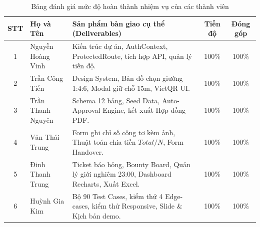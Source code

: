 \begin{table}[htbp]
\centering
\caption{Bảng đánh giá mức độ hoàn thành nhiệm vụ của các thành viên}
\label{tab:member_evaluation}
\small
\begin{tabularx}{\textwidth}{|c|l|X|c|c|}
\hline
\rowcolor{blue!10}
\textbf{STT} & \textbf{Họ và Tên} & \textbf{Sản phẩm bàn giao cụ thể (Deliverables)} & \textbf{Tiến độ} & \textbf{Đóng góp} \\ \hline
1 & Nguyễn Hoàng Vinh & Kiến trúc dự án, AuthContext, ProtectedRoute, tích hợp API, quản lý tiến độ. & 100\% & 100\% \\ \hline
2 & Trần Công Tiến & Design System, Bản đồ chọn giường 1:4:6, Modal giữ chỗ 15m, VietQR UI. & 100\% & 100\% \\ \hline
3 & Trần Thanh Nguyên & Schema 12 bảng, Seed Data, Auto-Approval Engine, kết xuất Hợp đồng PDF. & 100\% & 100\% \\ \hline
4 & Văn Thái Trung & Form ghi chỉ số công tơ kèm ảnh, Thuật toán chia tiền $Total/N$, Form Handover. & 100\% & 100\% \\ \hline
5 & Đinh Thanh Trung & Ticket báo hỏng, Bounty Board, Quản lý giới nghiêm 23:00, Dashboard Recharts, Xuất Excel. & 100\% & 100\% \\ \hline
6 & Huỳnh Gia Kim & Bộ 90 Test Cases, kiểm thử 4 Edge-cases, kiểm thử Responsive, Slide \& Kịch bản demo. & 100\% & 100\% \\ \hline
\end{tabularx}
\end{table}

